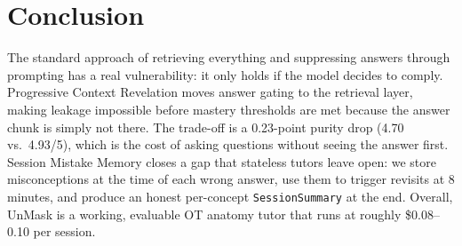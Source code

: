 \documentclass[11pt]{article}
\begin{document}
\section{Conclusion}

The standard approach of retrieving everything and suppressing answers through
prompting has a real vulnerability: it only holds if the model decides to comply.
Progressive Context Revelation moves answer gating to the retrieval layer,
making leakage impossible before mastery thresholds are met because
the answer chunk is simply not there.
The trade-off is a 0.23-point purity drop (4.70 vs.\ 4.93/5), which is the
cost of asking questions without seeing the answer first.
Session Mistake Memory closes a gap that stateless tutors leave open:
we store misconceptions at the time of each wrong answer, use them to trigger
revisits at 8 minutes, and produce an honest per-concept \texttt{SessionSummary}
at the end.
Overall, UnMask is a working, evaluable OT anatomy tutor that runs at roughly
\$0.08--0.10 per session.
\end{document}
